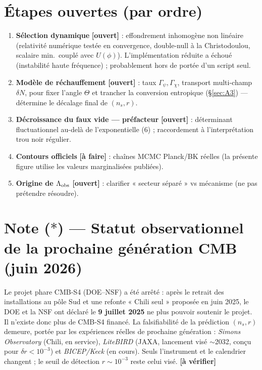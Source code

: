 \documentclass[11pt,a4paper]{article}
\newcommand{\st}[1]{\textbf{\textcolor{blue!45!black}{[#1]}}}
\begin{document}
\section{Étapes ouvertes (par ordre)}
\begin{enumerate}[leftmargin=1.6em,itemsep=1pt]
\item \textbf{Sélection dynamique} \st{ouvert} : effondrement inhomogène non linéaire (relativité numérique testée en convergence, double-null à la Christodoulou, scalaire min.\ couplé avec $U(\phi)$). L'implémentation réduite a échoué (instabilité haute fréquence) ; probablement hors de portée d'un script seul.
\item \textbf{Modèle de réchauffement} \st{ouvert} : taux $\Gamma_\psi,\Gamma_\chi$, transport multi-champ $\delta N$, pour fixer l'angle $\Theta$ et trancher la conversion entropique (\S\ref{sec:A3}) — détermine le décalage final de $(n_s,r)$.
\item \textbf{Décroissance du faux vide — préfacteur} \st{ouvert} : déterminant fluctuationnel au-delà de l'exponentielle (6) ; raccordement à l'interprétation trou noir régulier.
\item \textbf{Contours officiels} \st{à faire} : chaînes MCMC Planck/BK réelles (la présente figure utilise les valeurs marginalisées publiées).
\item \textbf{Origine de $\Lambda_{\rm obs}$} \st{ouvert} : clarifier « secteur séparé » vs mécanisme (ne pas prétendre résoudre).
\end{enumerate}

\section*{Note ($\ast$) — Statut observationnel de la prochaine génération CMB (juin 2026)}
\small Le projet phare CMB-S4 (DOE–NSF) a été arrêté : après le retrait des installations au pôle Sud et une refonte « Chili seul » proposée en juin 2025, le DOE et la NSF ont déclaré le \textbf{9 juillet 2025} ne plus pouvoir soutenir le projet. Il n'existe donc plus de CMB-S4 financé. La falsifiabilité de la prédiction $(n_s,r)$ demeure, portée par les expériences réelles de prochaine génération : \emph{Simons Observatory} (Chili, en service), \emph{LiteBIRD} (JAXA, lancement visé $\sim$2032, conçu pour $\delta r<10^{-3}$) et \emph{BICEP/Keck} (en cours). Seuls l'instrument et le calendrier changent ; le seuil de détection $r\sim10^{-3}$ reste celui visé. \st{à vérifier}
\normalsize
\end{document}
